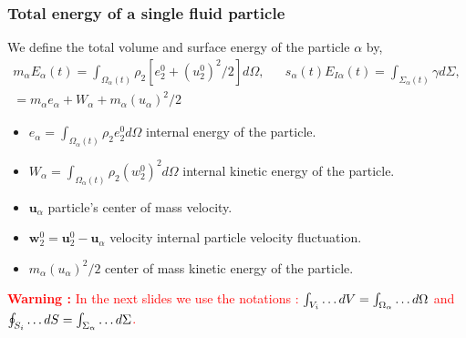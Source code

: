\documentclass{sintefbeamer}
\begin{document}
  \begin{frame}
    \frametitle{Total energy of a single fluid particle}
    We define the total volume and surface energy of the particle $\alpha$ by, 
    \begin{align*}
      m_\alpha E_\alpha(t) 
   = \int_{\Omega_\alpha(t)} \rho_2 [e_2^0 + (u_2^0)^2/2] d\Omega,
    &&
    s_\alpha(t) E_{I\alpha}(t) 
    = \int_{\Sigma_\alpha(t)} \gamma d\Sigma,\\
    = m_\alpha e_\alpha 
    + W_\alpha
    + m_\alpha (u_\alpha)^2/2
  \end{align*}

  \begin{itemize}
    \item $e_\alpha =  \int_{\Omega_\alpha(t)} \rho_2 e_2^0 d\Omega$ internal energy of the particle. 
    \item $W_\alpha = \int_{\Omega_\alpha(t)} \rho_2 (w_2^0)^2 d\Omega$ internal kinetic energy of the particle. 
    \item $\textbf{u}_\alpha$ particle's center of mass velocity. 
    \item $\textbf{w}_2^0 = \textbf{u}_2^0 - \textbf{u}_\alpha$ velocity internal particle velocity fluctuation. 
    \item $ m_\alpha (u_\alpha)^2/2$ center of mass kinetic energy of the particle. 
  \end{itemize}

  \textcolor{red}{\textbf{Warning : } In the next slides we use the notations :  $\int_{V_{i}} \ldots dV = \int_{\Omega_\alpha} \dots d\Omega$ and  $\oint_{S_{i}} \ldots dS = \int_{\Sigma_\alpha} \dots d\Sigma$.}
\end{frame}
\end{document}
